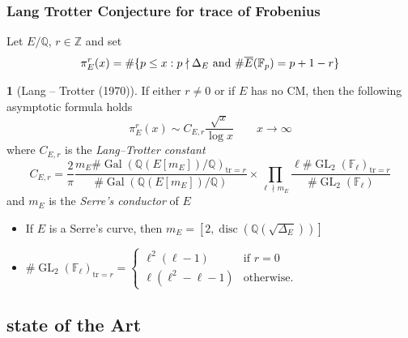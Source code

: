 \documentclass[10pt,handout]{beamer} %
\newcommand{\Q}{\mathbb Q}
\newcommand{\Z}{\mathbb Z}
\newcommand{\F}{\mathbb F}
\theoremstyle{definition}
\newtheorem{conj}[theorem]{\translate{Conjecture}}
\begin{document}
\begin{frame}
\frametitle{Lang Trotter Conjecture for trace of Frobenius} 
 Let $E/\Q$, $r\in\Z$  and set\pause
$$\pi_E^r(x)=\#\{p\le x: p\nmid\Delta_E\text{ and } \#\overline E(\F_p)=p+1-r\}\vspace*{-7pt}$$
\pause
\begin{conj}[Lang -- Trotter (1970)]
If either $r\ne0$ or if $E$ has no CM, \pause then
the following asymptotic formula holds
$$\pi_E^r(x)\sim C_{E,r}\frac{\sqrt{x}}{\log x}\qquad x\rightarrow\infty$$\pause
where $C_{E,r}$ is the  \emph{Lang--Trotter constant}
$$C_{E,r}=\frac2\pi\frac{m_E\#\operatorname{Gal}(\Q(E[m_E])/\Q)_{\text{tr}=r}}{\#\operatorname{Gal}(\Q(E[m_E])/\Q)}
\times\prod_{\ell\nmid m_E}\frac{\ell\#\operatorname{GL}_2(\F_\ell)_{\text{tr}=r}}{\#\operatorname{GL}_2(\F_\ell)}$$\pause
and $m_E$ is the \emph{Serre's conductor} of $E$\pause
 \end{conj}\pause

\begin{itemize}[<+-| alert@+>]
 \item If $E$ is a Serre's curve, then $m_E=[2,\operatorname{disc}(\Q(\sqrt{\Delta_E}))]$
 \item $\#\operatorname{GL}_2(\F_\ell)_{\text{tr}=r}=\begin{cases}
                   \ell^2(\ell-1) & \text{if } r=0\\
                   \ell(\ell^2-\ell-1) & \text{otherwise.}
                  \end{cases}
$
\end{itemize}\pause
\end{frame}

\subsection{state of the Art}
\end{document}
